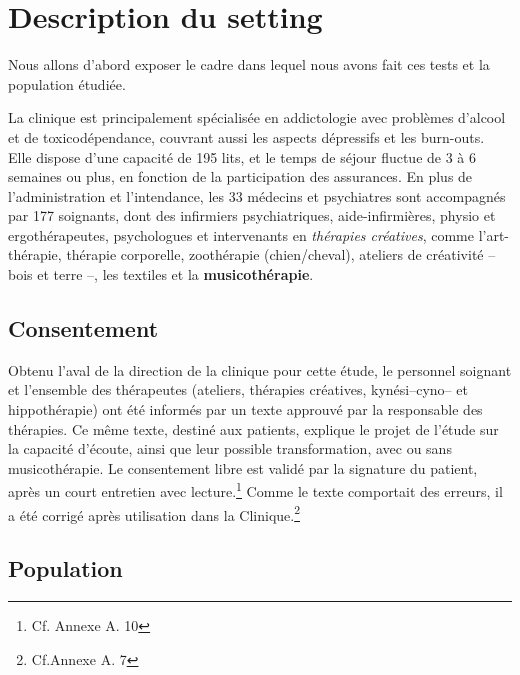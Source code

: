  
 
 \section{Description du setting}
 Nous allons
 d'abord exposer le cadre dans lequel nous avons fait ces tests et la
 population étudiée.
 
 La clinique  est  principalement spécialisée en
 addictologie avec problèmes d'alcool et de toxicodépendance, couvrant aussi les aspects dépressifs
 et les
 burn-outs.
 Elle dispose d'une capacité de 195 lits, et le temps de séjour fluctue de 3 à 6 semaines ou plus, en
 fonction de la participation des assurances.
En plus de l'administration et l'intendance, les 33
 médecins et psychiatres sont
 accompagnés par 177
 soignants, dont des infirmiers psychiatriques, aide-infirmières, physio et
 ergothérapeutes,
 psychologues et intervenants en \textit{thérapies
 créatives}, comme l'art-thérapie, thérapie
 corporelle, zoothérapie (chien/cheval),  ateliers de créativité --
 bois et terre --,  les textiles et la\textbf{ musicothérapie}.

 \subsection{Consentement}
 Obtenu l'aval de la direction de la
 clinique pour cette étude,  le personnel soignant et l'ensemble des
 thérapeutes (ateliers, thérapies créatives, kynési--cyno--
 et hippothérapie) ont été  informés par un texte approuvé par la responsable des thérapies.
 Ce même texte, destiné aux
 patients, explique le projet de l'étude sur la capacité d'écoute, ainsi que leur possible transformation,
 avec ou sans musicothérapie.
 Le consentement libre est validé par la signature du patient, après
 un court entretien avec lecture.\footnote{Cf. Annexe A. 10}
 Comme le texte comportait des erreurs, il a été 
 corrigé après utilisation dans la Clinique.\footnote{Cf.Annexe A. 7}
 
 
 \subsection{Population}
 
